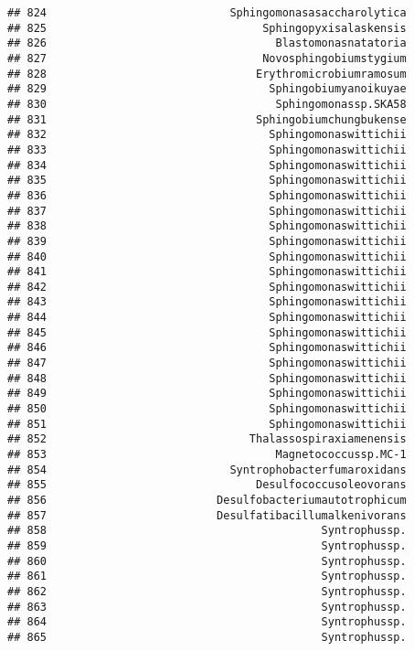 \documentclass[
]{article}
\begin{document}
\begin{verbatim}
## 824                            Sphingomonasasaccharolytica
## 825                                 Sphingopyxisalaskensis
## 826                                   Blastomonasnatatoria
## 827                                 Novosphingobiumstygium
## 828                                Erythromicrobiumramosum
## 829                                  Sphingobiumyanoikuyae
## 830                                   Sphingomonassp.SKA58
## 831                                Sphingobiumchungbukense
## 832                                  Sphingomonaswittichii
## 833                                  Sphingomonaswittichii
## 834                                  Sphingomonaswittichii
## 835                                  Sphingomonaswittichii
## 836                                  Sphingomonaswittichii
## 837                                  Sphingomonaswittichii
## 838                                  Sphingomonaswittichii
## 839                                  Sphingomonaswittichii
## 840                                  Sphingomonaswittichii
## 841                                  Sphingomonaswittichii
## 842                                  Sphingomonaswittichii
## 843                                  Sphingomonaswittichii
## 844                                  Sphingomonaswittichii
## 845                                  Sphingomonaswittichii
## 846                                  Sphingomonaswittichii
## 847                                  Sphingomonaswittichii
## 848                                  Sphingomonaswittichii
## 849                                  Sphingomonaswittichii
## 850                                  Sphingomonaswittichii
## 851                                  Sphingomonaswittichii
## 852                               Thalassospiraxiamenensis
## 853                                   Magnetococcussp.MC-1
## 854                            Syntrophobacterfumaroxidans
## 855                                Desulfococcusoleovorans
## 856                          Desulfobacteriumautotrophicum
## 857                          Desulfatibacillumalkenivorans
## 858                                          Syntrophussp.
## 859                                          Syntrophussp.
## 860                                          Syntrophussp.
## 861                                          Syntrophussp.
## 862                                          Syntrophussp.
## 863                                          Syntrophussp.
## 864                                          Syntrophussp.
## 865                                          Syntrophussp.

\end{verbatim}
\end{document}
